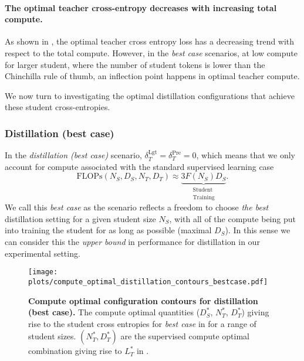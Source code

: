 \paragraph{The optimal teacher cross-entropy decreases with increasing total compute.} As shown in , the optimal teacher cross entropy loss has a decreasing trend with respect to the total compute. 
However, in the \emph{best case} scenarios, at low compute for larger student, 
where the number of student tokens is lower than the Chinchilla rule of thumb,
an inflection point happens in optimal teacher compute.

We now turn to investigating the optimal distillation configurations that achieve these student cross-entropies.

\FloatBarrier
\subsubsection{Distillation (best case)}
\label{sssec:distillation-best-case}

In the \emph{distillation (best case)} scenario, 
$\delta_T^{\mathrm{Lgt}}=\delta_T^{\mathrm{Pre}}=0$,
which means that we only account for compute associated with the standard supervised learning case
\begin{equation}
    \mathrm{FLOPs}(N_S,D_S,N_T,D_T)\approx
    \underbrace{3F(N_S)D_S}_{\substack{\mathrm{Student}\\\mathrm{Training}}}.
\end{equation}
We call this \emph{best case} as the scenario reflects a freedom to choose \emph{the best} distillation setting for a given student size $N_S$, with all of the compute being put into training the student for as long as possible (maximal $D_S$).
In this sense we can consider this the \emph{upper bound} in performance for distillation in our experimental setting.

\begin{figure}[h]
	\centering
	\texttt{[image: plots/compute\_optimal\_distillation\_contours\_bestcase.pdf]}
    \vspace{-0.25cm}
	\caption{\textbf{Compute optimal configuration contours for distillation (best case).} The compute optimal quantities ($D_S^*$, $N_T^*$, $D_T^*$) giving rise to the student cross entropies for \emph{best case} in 
 for a range of student sizes. $(N_T^*,D_T^*)$ are the supervised compute optimal combination giving rise to $L_T^*$ in .
	}
    \vspace{-0.25cm}
	\label{fig:compute-optimal-contours-bestcase-app}
\end{figure}

